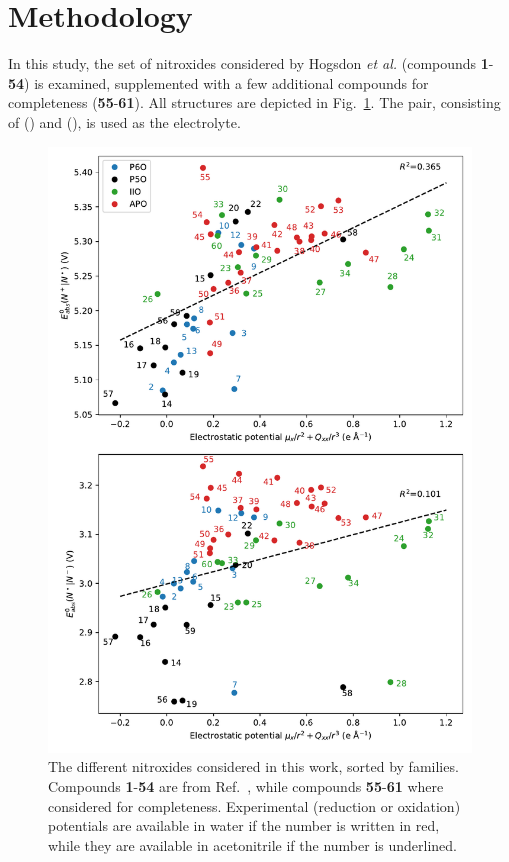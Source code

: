 \documentclass[review]{elsarticle}
\begin{document}
\section{Methodology}

In this study, the set of nitroxides considered by Hogsdon \textit{et al.} (compounds \textbf{1}-\textbf{54}) is examined, supplemented with a few additional compounds for completeness (\textbf{55}-\textbf{61}). All structures are depicted in Fig.~\ref{fig:nitroxides}. The  pair, consisting of  () and  (), is used as the electrolyte.


\begin{figure}[!p]
\centering
\includegraphics[width=\linewidth]{Figure6}
\caption{The different nitroxides considered in this work, sorted by families. Compounds \textbf{1}-\textbf{54} are from Ref.~, while compounds \textbf{55}-\textbf{61} where considered for completeness. Experimental (reduction or oxidation) potentials are available in water if the number is written in red, while they are available in acetonitrile if the number is underlined.}
\label{fig:nitroxides}
\end{figure}
\end{document}
